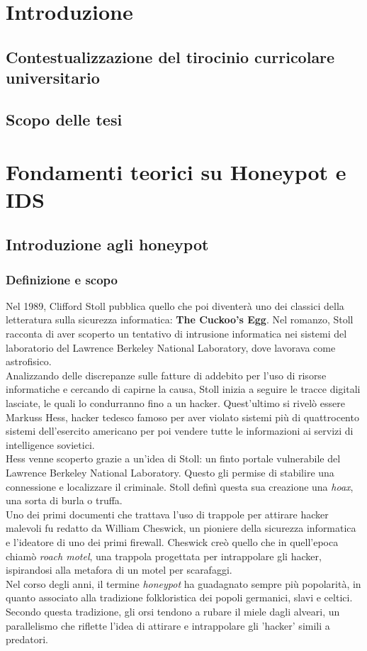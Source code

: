 \documentclass[12pt,a4paper,oneside,onecolumn,openright]{book}
\begin{document}
\tableofcontents

\chapter{Introduzione}
\section{Contestualizzazione del tirocinio curricolare universitario}
\section{Scopo delle tesi}


\chapter{Fondamenti teorici su Honeypot e IDS}
\section{Introduzione agli honeypot}
\subsection{Definizione e scopo}
Nel 1989, Clifford Stoll pubblica quello che poi diventerà uno dei classici della 
letteratura sulla sicurezza informatica: \textbf{The Cuckoo's Egg}. 
Nel romanzo, Stoll racconta di aver scoperto un tentativo di intrusione informatica 
nei sistemi del laboratorio del Lawrence Berkeley National Laboratory, 
dove lavorava come astrofisico.\\
Analizzando delle discrepanze sulle fatture di addebito per l'uso di risorse informatiche 
e cercando di capirne la causa, Stoll inizia a seguire le tracce digitali lasciate, 
le quali lo condurranno fino a un hacker. Quest'ultimo si rivelò essere Markuss Hess, 
hacker tedesco famoso per aver violato sistemi più di quattrocento sistemi dell'esercito 
americano per poi vendere tutte le informazioni ai servizi di intelligence sovietici.\\
Hess venne scoperto grazie a un'idea di Stoll: un finto portale vulnerabile del 
Lawrence Berkeley National Laboratory. Questo gli permise di stabilire una connessione 
e localizzare il criminale. Stoll definì questa sua creazione una \textit{hoax}, 
una sorta di burla o truffa.\\
Uno dei primi documenti che trattava l'uso di trappole per attirare hacker malevoli 
fu redatto da William Cheswick, un pioniere della sicurezza informatica e l'ideatore di 
uno dei primi firewall. Cheswick creò quello che in quell'epoca chiamò \textit{roach motel}, 
una trappola progettata per intrappolare gli hacker, ispirandosi alla metafora di un 
motel per scarafaggi.\\
Nel corso degli anni, il termine \textit{honeypot} ha guadagnato sempre più popolarità, 
in quanto associato alla tradizione folkloristica dei popoli germanici, 
slavi e celtici. Secondo questa tradizione, gli orsi tendono a rubare il miele dagli 
alveari, un parallelismo che riflette l'idea di attirare e intrappolare gli 'hacker' 
simili a predatori.\\
\end{document}
